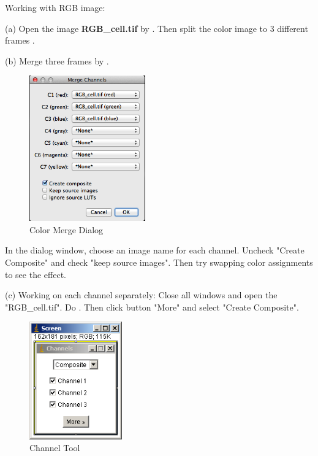 \begin{indentexercise}{1}
Working with RGB image:
 
\item (a) Open the image \textbf{RGB\_cell.tif} by . Then split the color image to 3 different frames . 

\item (b) Merge three frames by . 

\begin{figure}[H]
\begin{center}
\includegraphics[width=5cm]{img/dialog_colormerge.png}
\caption{ Color Merge Dialog}
\label{fig:img14}
\end{center}
\end{figure}

In the dialog window, choose an image name for each channel. Uncheck
"Create Composite" and check
"keep source images". Then try
swapping color assignments to see the effect. 

\item (c) Working on each channel separately: Close all windows and
open the "RGB\_cell.tif". Do
. Then click button "More" and select "Create Composite".
\begin{figure}[H]
\begin{center}
\includegraphics[width=4cm]{img/CMCIBasicCourse201102-img15.png}
\caption{ Channel Tool}
\label{fig:img15}
\end{center}
\end{figure}


\end{indentexercise}
